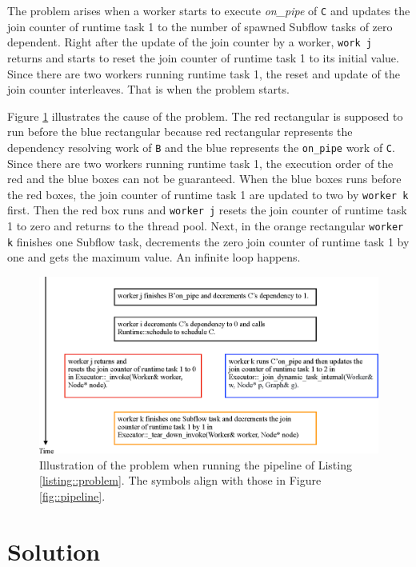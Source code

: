 \documentclass[11pt,twoside]{article}
\theoremstyle{plain}
\theoremstyle{definition}
\theoremstyle{remark}
\begin{document}
The problem arises when a worker starts to execute \textit{on\_pipe} of \texttt{C}
and updates the join counter of runtime task 1 to the number of spawned Subflow tasks
of zero dependent.
Right after the update of the join counter by a worker,
\texttt{work j} returns and starts to reset the join counter of runtime task 1 to its
initial value. 
Since there are two workers running runtime task 1, the reset and update
of the join counter interleaves.
That is when the problem starts. 

Figure \ref{fig::illustration} illustrates the cause of the problem.
The red rectangular is supposed to run before the blue rectangular because
red rectangular represents the dependency resolving work of \texttt{B}
and the blue represents the \texttt{on\_pipe} work of \texttt{C}.
Since there are two workers running runtime task 1,
the execution order of the red and the blue boxes
can not be guaranteed.
When the blue boxes runs before the red boxes,
the join counter of runtime task 1 
are updated to two by \texttt{worker k} first.
Then the red box runs and \texttt{worker j} resets
the join counter of runtime task 1 to zero and returns to the thread pool.
Next, in the orange rectangular \texttt{worker k} finishes
one Subflow task, decrements the zero join counter of runtime task 1 by one
and gets the maximum value. An infinite loop happens.
  


\begin{figure}[!h]
  \centering
  \centerline{\includegraphics[width=.9\columnwidth]{Figure/illustration.eps}}
  \caption{
    Illustration of the problem when running the pipeline of Listing \ref{listing::problem}.
    The symbols align with those in Figure \ref{fig::pipeline}.
  }
  \label{fig::illustration}
\end{figure}



\section{Solution}
\end{document}
